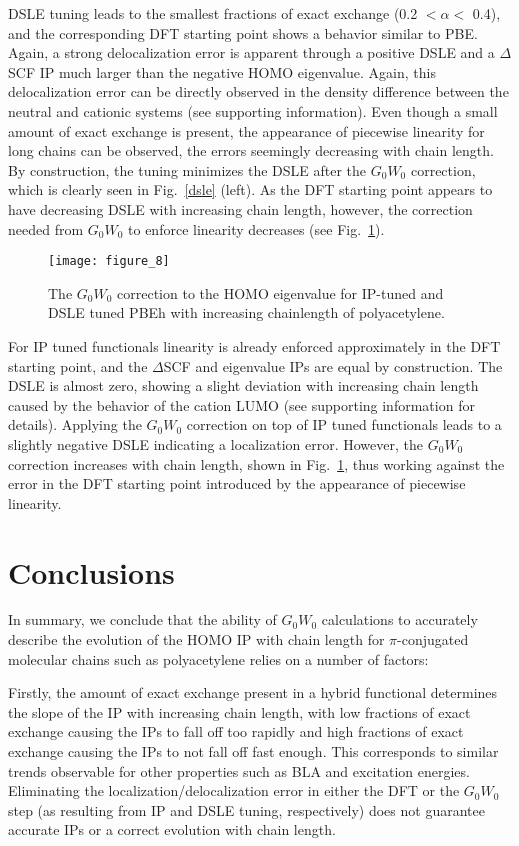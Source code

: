 \documentclass[journal=jctcce,manuscript=article,layout=twocolumn]{achemso}
\begin{document}
DSLE tuning leads to the smallest fractions of exact exchange (0.2 $<\alpha<$ 0.4), and the corresponding DFT starting point shows a behavior similar to PBE. Again, a strong delocalization error is apparent through a positive DSLE and a $\Delta$SCF IP much 
larger than the negative HOMO eigenvalue. Again, this delocalization error can be directly observed in the density difference between the neutral and cationic systems (see supporting information).  Even though a small amount of exact exchange is present, the appearance of piecewise linearity for long chains can be observed, the errors seemingly decreasing with chain length. By construction, the tuning 
minimizes the DSLE after the $G_0W_0$ correction, which is clearly seen in Fig.~\ref{dsle} (left). As the DFT starting point appears to have decreasing DSLE with increasing chain length, however, the correction needed from $G_0W_0$ 
to enforce linearity decreases (see Fig.~\ref{gw_corr}). 

\begin{figure}[tbh]
\texttt{[image: figure\_8]}
\caption{The $G_0W_0$ correction to the HOMO eigenvalue for IP-tuned and DSLE tuned PBEh with increasing chainlength of polyacetylene.\label{gw_corr}}
\end{figure}

For IP tuned functionals linearity is already enforced approximately in the DFT starting point, and the $\Delta$SCF and eigenvalue IPs are equal by construction. The DSLE is almost zero, showing a slight deviation with increasing
chain length caused by the behavior of the cation LUMO (see supporting information for details). Applying the $G_0W_0$ correction on top of IP tuned functionals leads to a slightly negative DSLE indicating a localization error. 
However, the $G_0W_0$ correction increases with chain length,
shown in Fig.~\ref{gw_corr}, thus working against the error in the DFT starting point introduced by the appearance of piecewise linearity.

\section{Conclusions}
In summary, we conclude that the ability of $G_0W_0$ calculations to accurately describe the evolution of the HOMO IP with chain length for $\pi$-conjugated molecular chains such as polyacetylene relies on a number of factors:

Firstly, the amount of exact exchange present in a hybrid functional determines the slope of the IP with increasing chain length, with low fractions of exact exchange causing the IPs to fall off too rapidly and high
fractions of exact exchange causing the IPs to not fall off fast enough. This corresponds to similar trends observable for other properties such as BLA and excitation energies.\cite{jcp_2011_range_sep_conj,jctc_2016_BLA_Ex_thermal} Eliminating the localization/delocalization 
error in either the DFT or the $G_0W_0$ step (as resulting from IP and DSLE tuning, respectively) does not guarantee accurate IPs or a correct evolution with chain length.
\end{document}
